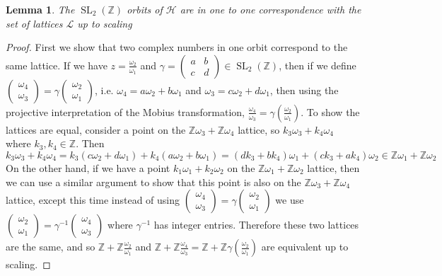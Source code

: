 \documentclass{article}
\newtheorem{lemma}[theorem]{Lemma}
\theoremstyle{definition}
\theoremstyle{definition}
\theoremstyle{definition}
\newcommand{\SLZ}{\operatorname{SL}_2(\mathbb{Z})}
\newcommand{\Z}{\mathbb{Z}}
\newcommand{\Mabcd}{\begin{pmatrix} a&b\\c&d \end{pmatrix}}
\begin{document}
\begin{lemma} The $\SLZ$ orbits of $\mathcal{H}$ are in one to one correspondence with the set of lattices $\mathcal{L}$ up to scaling %
\end{lemma}
\begin{proof}
First we show that two complex numbers in one orbit correspond to the same lattice. If we have $z=\frac{\omega_2}{\omega_1}$ and $\gamma=\Mabcd\in\SLZ$, then if we define $\begin{pmatrix} \omega_4\\\omega_3 \end{pmatrix}=\gamma\begin{pmatrix} \omega_2\\\omega_1 \end{pmatrix}$, i.e. $\omega_4=a\omega_2+b\omega_1$ and $\omega_3=c\omega_2+d\omega_1$, then using the projective interpretation of the Mobius transformation, $\frac{\omega_4}{\omega_3}=\gamma\left(\frac{\omega_2}{\omega_1}\right)$. To show the lattices are equal, consider a point on the $\Z\omega_3+\Z\omega_4$ lattice, so $k_3\omega_3+k_4\omega_4$ where $k_3,k_4\in\Z$. Then
$$k_3\omega_3+k_4\omega_4=k_3(c\omega_2+d\omega_1)+k_4(a\omega_2+b\omega_1)=(dk_3+bk_4)\omega_1+(ck_3+ak_4)\omega_2\in\Z\omega_1+\Z\omega_2$$
On the other hand, if we have a point $k_1\omega_1+k_2\omega_2$ on the $\Z\omega_1+\Z\omega_2$ lattice, then we can use a similar argument to show that this point is also on the $\Z\omega_3+\Z\omega_4$ lattice, except this time instead of using $\begin{pmatrix} \omega_4\\\omega_3 \end{pmatrix}=\gamma\begin{pmatrix} \omega_2\\\omega_1 \end{pmatrix}$ we use $\begin{pmatrix} \omega_2\\\omega_1 \end{pmatrix}=\gamma^{-1}\begin{pmatrix} \omega_4\\\omega_3 \end{pmatrix}$ where $\gamma^{-1}$ has integer entries. Therefore these two lattices are the same, and so $\Z+\Z\frac{\omega_2}{\omega_1}$ and $\Z+\Z\frac{\omega_4}{\omega_3}=\Z+\Z\gamma\left(\frac{\omega_2}{\omega_1}\right)$ are equivalent up to scaling.


\end{proof}
\end{document}
